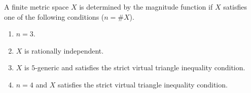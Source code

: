 \begin{theorem}\label{theorem}
A finite metric space $X$ 
is determined by the magnitude function if $X$ satisfies one of the following conditions ($n=\#X$). 

\begin{enumerate}
\item $n=3$. 
\item $X$ is rationally independent. 
\item $X$ is $5$-generic and satisfies the strict virtual triangle inequality condition. %
\item $n=4$ and $X$ satisfies the strict virtual triangle inequality condition. %
\end{enumerate}

\end{theorem}
